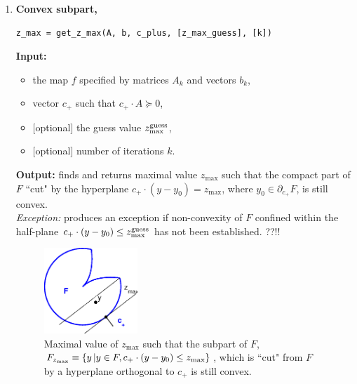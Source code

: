 \documentclass[a4paper]{article}
\theoremstyle{definition}
\begin{document}
\begin{enumerate}
\item {\bf Convex subpart,\hskip 6pt}
\begin{verbatim}
z_max = get_z_max(A, b, c_plus, [z_max_guess], [k])
\end{verbatim}
{\bf Input:}
\begin{itemize}
	\item the map $f$ specified by matrices $A_k$ and vectors $b_k$,
	\item vector $c_+$ such that $c_+\cdot A\succeq 0$,
	\item $[$optional$]$ the guess value  $z^{\rm guess}_{\rm max}$,
	\item $[$optional$]$ number of iterations $k$.
\end{itemize}
{\bf Output:} finds and returns maximal value $z_{\max}$ such that the compact part of $F$ ``cut" by the hyperplane  $c_+ \cdot (y-y_0)=z_{\max}$, where $y_0\in \partial_{c_+}F$, is still convex. \\
{\it Exception:} produces an exception if non-convexity of $F$ confined within the half-plane $c_+ \cdot (y-y_0)\leq z^{\rm guess}_{\rm max}$  has not been established.  ??!!

\begin{figure}[H]
	\centering\includegraphics[width=100pt]{fig/get_z_max}
	\caption{Maximal value of $z_{\max}$ such that  the subpart of $F$, $F_{z_{\rm max}}\equiv \{y\, | y\in F, c_+ \cdot (y-y_0)\leq z_{\rm max}\}$, which is ``cut" from $F$ by a hyperplane orthogonal  to $c_+$ is still convex.}
\label{fig:four}
\end{figure}




\end{enumerate}
\end{document}
